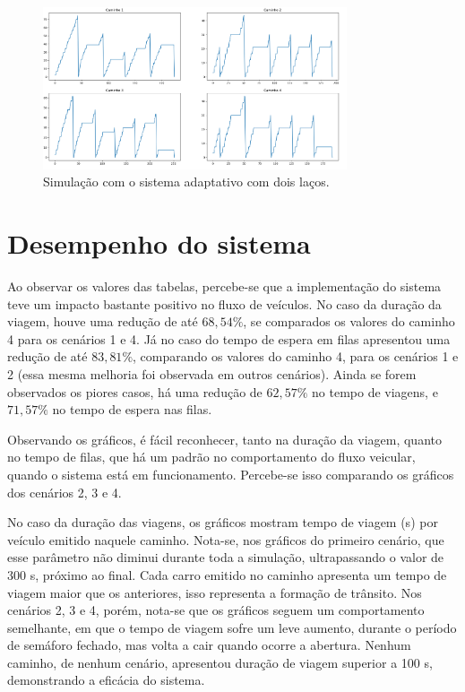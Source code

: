 \begin{figure}[H]
    \begin{center}
    \includegraphics[width=0.8\textwidth]{figuras/Queue_Duration_With_Two_Loop.PNG}
    \end{center}
    \caption[Duração das filas, cenário 4]{Simulação com o sistema adaptativo com dois laços.}
    \label{queueTwoLoop}
\end{figure}

\section{Desempenho do sistema}

Ao observar os valores das tabelas, percebe-se que a implementação do sistema teve um impacto bastante positivo no fluxo de veículos. No caso da duração da viagem, houve uma redução de até $68,54\%$, se comparados os valores do caminho 4 para os cenários 1 e 4. Já no caso do tempo de espera em filas apresentou uma redução de até $83,81\%$, comparando os valores do caminho 4, para os cenários 1 e 2 (essa mesma melhoria foi observada em outros cenários). Ainda se forem observados os piores casos, há uma redução de $62,57\%$ no tempo de viagens, e $71,57\%$ no tempo de espera nas filas.

Observando os gráficos, é fácil reconhecer, tanto na duração da viagem, quanto no tempo de filas, que há um padrão no comportamento do fluxo veicular, quando o sistema está em funcionamento. Percebe-se isso comparando os gráficos dos cenários 2, 3 e 4. 

No caso da duração das viagens, os gráficos mostram tempo de viagem (s) por veículo emitido naquele caminho. 
Nota-se, nos gráficos do primeiro cenário, que esse parâmetro não diminui durante toda a simulação, ultrapassando o valor de 300 s, próximo ao final. Cada carro emitido no caminho apresenta um tempo de viagem maior que os anteriores, isso representa a formação de trânsito. 
Nos cenários 2, 3 e 4, porém, nota-se que os gráficos seguem um comportamento semelhante, em que o tempo de viagem sofre um leve aumento, durante o período de semáforo fechado, mas volta a cair quando ocorre a abertura. Nenhum caminho, de nenhum cenário, apresentou duração de viagem superior a 100 s, demonstrando a eficácia do sistema. 

